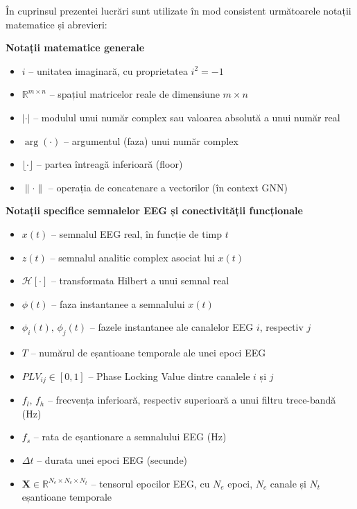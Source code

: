 \documentclass[12pt,a4paper]{report}
\theoremstyle{definition}
\theoremstyle{remark}
\begin{document}
În cuprinsul prezentei lucrări sunt utilizate în mod consistent următoarele notații matematice și abrevieri:

\vspace{8pt}
\noindent\textbf{Notații matematice generale}
\begin{itemize}
    \item $i$ -- unitatea imaginară, cu proprietatea $i^2 = -1$
    \item $\mathbb{R}^{m \times n}$ -- spațiul matricelor reale de dimensiune $m \times n$
    \item $|\cdot|$ -- modulul unui număr complex sau valoarea absolută a unui număr real
    \item $\arg(\cdot)$ -- argumentul (faza) unui număr complex
    \item $\lfloor \cdot \rfloor$ -- partea întreagă inferioară (floor)
    \item $\|\cdot\|$ -- operația de concatenare a vectorilor (în context GNN)
\end{itemize}

\vspace{8pt}
\noindent\textbf{Notații specifice semnalelor EEG și conectivității funcționale}
\begin{itemize}
    \item $x(t)$ -- semnalul EEG real, în funcție de timp $t$
    \item $z(t)$ -- semnalul analitic complex asociat lui $x(t)$
    \item $\mathcal{H}[\cdot]$ -- transformata Hilbert a unui semnal real
    \item $\phi(t)$ -- faza instantanee a semnalului $x(t)$
    \item $\phi_i(t),\, \phi_j(t)$ -- fazele instantanee ale canalelor EEG $i$, respectiv $j$
    \item $T$ -- numărul de eșantioane temporale ale unei epoci EEG
    \item $PLV_{ij} \in [0, 1]$ -- Phase Locking Value dintre canalele $i$ și $j$
    \item $f_l,\, f_h$ -- frecvența inferioară, respectiv superioară a unui filtru trece-bandă (Hz)
    \item $f_s$ -- rata de eșantionare a semnalului EEG (Hz)
    \item $\Delta t$ -- durata unei epoci EEG (secunde)
    \item $\mathbf{X} \in \mathbb{R}^{N_e \times N_c \times N_t}$ -- tensorul epocilor EEG, cu $N_e$ epoci, $N_c$ canale și $N_t$ eșantioane temporale
\end{itemize}
\end{document}
